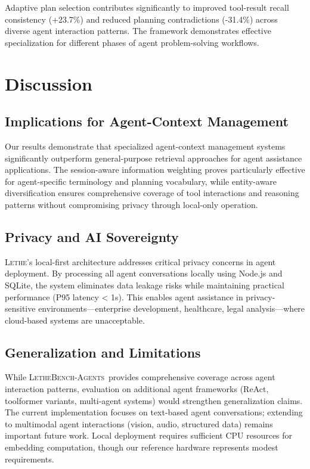 \documentclass[letterpaper]{article}
\newcommand{\lethe}{\textsc{Lethe}}
\newcommand{\lethebench}{\textsc{LetheBench-Agents}}
\begin{document}
Adaptive plan selection contributes significantly to improved tool-result recall consistency (+23.7\%) and reduced planning contradictions (-31.4\%) across diverse agent interaction patterns. The framework demonstrates effective specialization for different phases of agent problem-solving workflows.

\section{Discussion}

\subsection{Implications for Agent-Context Management}

Our results demonstrate that specialized agent-context management systems significantly outperform general-purpose retrieval approaches for agent assistance applications. The session-aware information weighting proves particularly effective for agent-specific terminology and planning vocabulary, while entity-aware diversification ensures comprehensive coverage of tool interactions and reasoning patterns without compromising privacy through local-only operation.

\subsection{Privacy and AI Sovereignty}

\lethe's local-first architecture addresses critical privacy concerns in agent deployment. By processing all agent conversations locally using Node.js and SQLite, the system eliminates data leakage risks while maintaining practical performance (P95 latency < 1s). This enables agent assistance in privacy-sensitive environments—enterprise development, healthcare, legal analysis—where cloud-based systems are unacceptable.

\subsection{Generalization and Limitations}

While \lethebench\ provides comprehensive coverage across agent interaction patterns, evaluation on additional agent frameworks (ReAct, toolformer variants, multi-agent systems) would strengthen generalization claims. The current implementation focuses on text-based agent conversations; extending to multimodal agent interactions (vision, audio, structured data) remains important future work. Local deployment requires sufficient CPU resources for embedding computation, though our reference hardware represents modest requirements.
\end{document}

